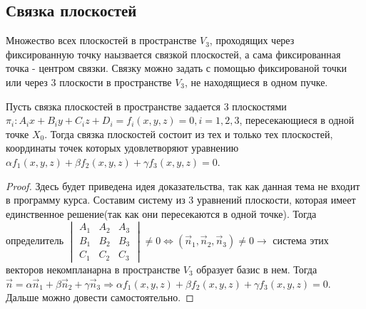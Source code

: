 \subsection{Связка плоскостей}
\begin{definition}
	Множество всех плоскостей в пространстве \(V_3\), проходящих через фиксированную точку наызвается связкой плоскостей, а сама фиксированная точка - центром связки.\newline
	Связку можно задать с помощью фиксированой точки или через 3 плоскости в пространстве \(V_3\), не находящиеся в одном пучке.
\end{definition}
\begin{theorem}
	Пусть связка плоскостей в пространстве задается 3 плоскостями \(\pi_i: A_ix+B_iy+C_iz+D_i = f_i(x,y,z) = 0, i = 1,2,3\), пересекающиеся в одной точке \(X_0\). Тогда связка плоскостей состоит из тех и только тех плоскостей, координаты точек которых удовлетворяют уравнению \(\alpha f_1(x,y,z) + \beta f_2(x,y,z)+\gamma f_3(x,y,z) = 0\).
\end{theorem}
\begin{proof}
	Здесь будет приведена идея доказательства, так как данная тема не входит в программу курса. Составим систему из 3 уравнений плоскости, которая имеет единственное решение(так как они пересекаются в одной точке). Тогда определитель \(\begin{vmatrix}
	A_1 & A_2 & A_3 \\ B_1 & B_2 & B_3 \\ C_1 & C_2 & C_3
	\end{vmatrix} \ne 0 \Longleftrightarrow (\vec n_1, \vec n_2, \vec n_3) \ne 0\longrightarrow\) система этих векторов некомпланарна в пространстве \(V_3\) образует базис в нем. Тогда \(\vec n = \alpha \vec n_1 + \beta \vec n_2 + \gamma \vec n_3\Longrightarrow \alpha f_1(x,y,z) + \beta f_2(x,y,z) + \gamma f_3(x,y,z) = 0\). Дальше можно довести самостоятельно.
\end{proof}

